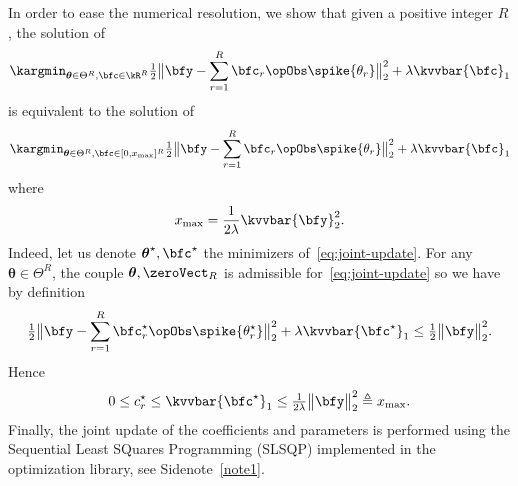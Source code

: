 In order to ease the numerical resolution, we show that given a positive integer $R$, the solution of
\begin{equation}
	\label{eq:joint-update}
	\kargmin_{\boldsymbol{\theta}\in\Theta^R,\bfc\in\kR^R} \tfrac{1}{2} \big\Vert{\bfy - \sum_{r=1}^R \bfc_r \opObs\spike{\theta_r}}\big\Vert_2^2 + \lambda\kvvbar{\bfc}_1
\end{equation}
is equivalent to the solution of
\begin{equation}
	\kargmin_{\boldsymbol{\theta}\in\Theta^R,\bfc\in[0, x_{\max}]^R} \tfrac{1}{2} \big\Vert{\bfy - \sum_{r=1}^R \bfc_r \opObs\spike{\theta_r}}\big\Vert_2^2 + \lambda\kvvbar{\bfc}_1
\end{equation}
where
\begin{equation}
	x_{\max} = \frac{1}{2\lambda} \kvvbar{\bfy}_2^2.
\end{equation}
Indeed, let us denote $\boldsymbol{\theta}^\star,\bfc^\star$ the minimizers of~\eqref{eq:joint-update}.
For any $\boldsymbol{\theta}\in\Theta^R$, the couple $\boldsymbol{\theta},\zeroVect_R$ is admissible for~\eqref{eq:joint-update} so we have by definition
\begin{equation}
	\tfrac{1}{2}\big\Vert{\bfy - \sum_{r=1}^R \bfc^\star_r \opObs\spike{\theta^\star_r}}\big\Vert_2^2 + \lambda\kvvbar{\bfc^\star}_1
	\leq
	\tfrac{1}{2} \big\Vert \bfy \big\Vert_2^2
	.
\end{equation}
Hence
\begin{equation}
	0 \leq c_r^\star \leq \kvvbar{\bfc^\star}_1 \leq \tfrac{1}{2\lambda} \big\Vert \bfy \big\Vert_2^2 \triangleq x_{\max}
		.
\end{equation}
Finally, the joint update of the coefficients and parameters is performed using the Sequential Least SQuares Programming (SLSQP) implemented in the  optimization library, see Sidenote~\ref{note1}.
